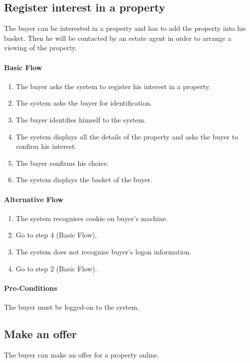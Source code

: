 \documentclass[a4paper,12pt]{article}
\begin{document}
\subsection{Register interest in a property}
The buyer can be interested in a property and has to add the property into his basket. Then he will be contacted by an estate agent in order to arrange a viewing of the property.
\paragraph{Basic Flow}
\begin{enumerate}
\item The buyer asks the system to register his interest in a property.
\item The system asks the buyer for identification.
\item The buyer identifies himself to the system.
\item The system displays all the details of the property and asks the buyer to confirm his interest.
\item The buyer confirms his choice.
\item The system displays the basket of the buyer.
\end{enumerate}
\paragraph{Alternative Flow}
\begin{enumerate}
\item The system recognises cookie on buyer's machine.
\item Go to step 4 (Basic Flow).
\item The system does not recognise buyer's logon information.
\item Go to step 2 (Basic Flow).
\end{enumerate}
\paragraph{Pre-Conditions}
The buyer must be logged-on to the system.

\subsection{Make an offer}
The buyer can make an offer for a property online.
\end{document}
